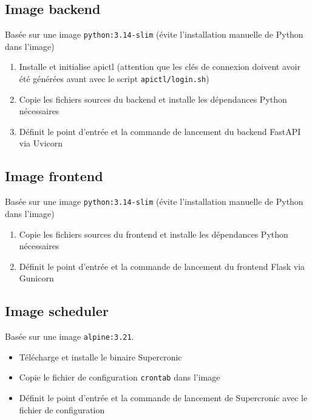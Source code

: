
\subsection{Image backend}
Basée sur une image \texttt{python:3.14-slim} (évite l'installation manuelle de Python dans l'image)

\begin{enumerate}
    \item Installe et initialise apictl (attention que les clés de connexion doivent avoir été générées avant avec le script \texttt{apictl/login.sh})
    \item Copie les fichiers sources du backend et installe les dépendances Python nécessaires
    \item Définit le point d'entrée et la commande de lancement du backend FastAPI via Uvicorn
\end{enumerate}


\subsection{Image frontend}
Basée sur une image \texttt{python:3.14-slim} (évite l'installation manuelle de Python dans l'image)

\begin{enumerate}
    \item Copie les fichiers sources du frontend et installe les dépendances Python nécessaires
    \item Définit le point d'entrée et la commande de lancement du frontend Flask via Gunicorn
\end{enumerate}


\subsection{Image scheduler}
Basée sur une image \texttt{alpine:3.21}.

\begin{itemize}
    \item[$\bullet$] Télécharge et installe le binaire Supercronic
    \item[$\bullet$] Copie le fichier de configuration \texttt{crontab} dans l'image
    \item[$\bullet$] Définit le point d'entrée et la commande de lancement de Supercronic avec le fichier de configuration
\end{itemize}

